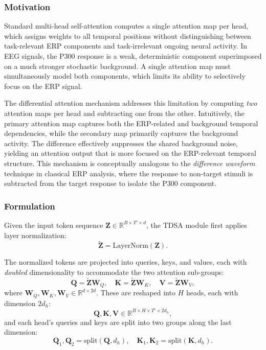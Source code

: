 \subsubsection{Motivation}

Standard multi-head self-attention computes a single attention map per head, which assigns weights to all temporal positions without distinguishing between task-relevant ERP components and task-irrelevant ongoing neural activity. In EEG signals, the P300 response is a weak, deterministic component superimposed on a much stronger stochastic background. A single attention map must simultaneously model both components, which limits its ability to selectively focus on the ERP signal.

The differential attention mechanism addresses this limitation by computing \emph{two} attention maps per head and subtracting one from the other. Intuitively, the primary attention map captures both the ERP-related and background temporal dependencies, while the secondary map primarily captures the background activity. The difference effectively suppresses the shared background noise, yielding an attention output that is more focused on the ERP-relevant temporal structure. This mechanism is conceptually analogous to the \emph{difference waveform} technique in classical ERP analysis, where the response to non-target stimuli is subtracted from the target response to isolate the P300 component.

\subsubsection{Formulation}

Given the input token sequence $\mathbf{Z} \in \mathbb{R}^{B \times T' \times d}$, the TDSA module first applies layer normalization:
\begin{equation}
    \tilde{\mathbf{Z}} = \text{LayerNorm}(\mathbf{Z}).
\end{equation}

The normalized tokens are projected into queries, keys, and values, each with \emph{doubled} dimensionality to accommodate the two attention sub-groups:
\begin{equation}
    \mathbf{Q} = \tilde{\mathbf{Z}} \mathbf{W}_Q, \quad
    \mathbf{K} = \tilde{\mathbf{Z}} \mathbf{W}_K, \quad
    \mathbf{V} = \tilde{\mathbf{Z}} \mathbf{W}_V,
\end{equation}
where $\mathbf{W}_Q, \mathbf{W}_K, \mathbf{W}_V \in \mathbb{R}^{d \times 2d}$. These are reshaped into $H$ heads, each with dimension $2d_h$:
\begin{equation}
    \mathbf{Q}, \mathbf{K}, \mathbf{V} \in \mathbb{R}^{B \times H \times T' \times 2d_h},
\end{equation}
and each head's queries and keys are split into two groups along the last dimension:
\begin{equation}
    \mathbf{Q}_1, \mathbf{Q}_2 = \text{split}(\mathbf{Q}, d_h), \quad
    \mathbf{K}_1, \mathbf{K}_2 = \text{split}(\mathbf{K}, d_h).
\end{equation}

